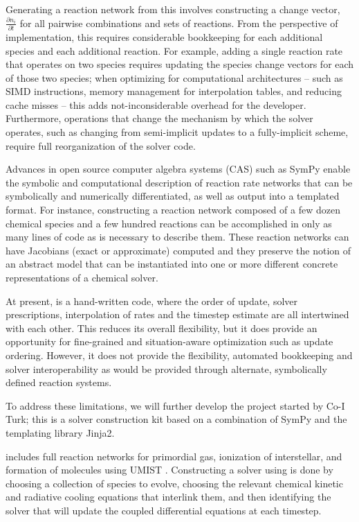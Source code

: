 Generating a reaction network from this involves constructing a change vector,
$\frac{\partial n_i}{\partial t}$ for all pairwise combinations and sets of
reactions.  From the perspective of implementation, this requires considerable
bookkeeping for each additional species and each additional reaction.  For
example, adding a single reaction rate that operates on two species requires
updating the species change vectors for each of those two species; when
optimizing for computational architectures -- such as SIMD instructions, memory
management for interpolation tables, and reducing cache misses -- this adds
not-inconsiderable overhead for the developer.  Furthermore, operations that
change the mechanism by which the solver operates, such as changing from
semi-implicit updates to a fully-implicit scheme, require full reorganization
of the solver code.  

Advances in open source computer algebra systems (CAS) such as SymPy
\citep{10.7717/peerj-cs.103} enable the symbolic and computational description
of reaction rate networks that can be symbolically and numerically
differentiated, as well as output into a templated format.  For instance,
constructing a reaction network composed of a few dozen chemical species and a
few hundred reactions can be accomplished in only as many lines of code as is
necessary to describe them.  These reaction networks can have Jacobians (exact
or approximate) computed and they preserve the notion of an abstract model that
can be instantiated into one or more different concrete representations of a
chemical solver.

At present, \grackle{} is a hand-written code, where the order of update, solver
prescriptions, interpolation of rates and the timestep estimate are all
intertwined with each other.  This reduces its overall flexibility, but it does
provide an opportunity for fine-grained and situation-aware optimization such
as update ordering.  However, it does not provide the flexibility, automated
bookkeeping and solver interoperability as would be provided through alternate,
symbolically defined reaction systems.

To address these limitations, we will further develop the project \dengo{}
started by Co-I Turk; this is a solver construction kit based on a combination
of SymPy and the templating library Jinja2.  


\dengo{} includes full reaction networks for primordial gas, ionization of
interstellar, and formation of molecules using UMIST
\citep{2013A&A...550A..36M}.  Constructing a solver using \dengo{} is done by
choosing a collection of species to evolve, choosing the relevant chemical
kinetic and radiative cooling equations that interlink them, and then
identifying the solver that will update the coupled differential equations at
each timestep.

